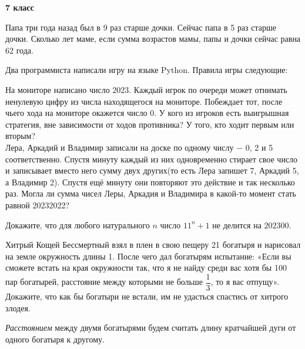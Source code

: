 \hspace{3mm}

\centerline{\bf \Huge 7 класс}

\hspace{3mm}

 Папа три года назад был в 9 раз старше дочки. Сейчас папа в 5 раз старше дочки. Сколько лет маме, если сумма возрастов мамы, папы и дочки сейчас равна 62 года.

 Два программиста написали игру на языке Python. Правила игры следующие:\par
На мониторе написано число 2023. Каждый игрок по очереди может отнимать ненулевую цифру из числа находящегося на мониторе. Побеждает тот, после чьего хода на мониторе окажется число 0. У кого из игроков есть выигрышная стратегия, вне зависимости от ходов противника? У того, кто ходит первым или вторым? \\
 Лера, Аркадий и Владимир записали на доске по одному числу $-$ 0, 2 и 5 соответственно. Спустя минуту каждый из них одновременно стирает свое число и записывает вместо него сумму двух других(то есть Лера запишет 7, Аркадий 5, а Владимир 2). Спустя ещё минуту они повторяют это действие и так несколько раз. Могла ли сумма чисел Леры, Аркадия и Владимира в какой-то момент стать равной 20232022?


 Докажите, что для любого натурального $n$ число $11^n + 1$ не делится на $202300$.


 Хитрый Кощей Бессмертный взял в плен в свою пещеру 21 богатыря и нарисовал на земле окружность длины 1. После чего дал богатырям испытание: «Если вы сможете встать на края окружности так, что я не найду среди вас хотя бы 100 пар богатырей, расстояние между которыми не больше $\dfrac{1}{3}$, то я вас отпущу». Докажите, что как бы богатыри не встали, им не удасться спастись от хитрого злодея. 
\par
\textit{Расстоянием} между двумя богатырями будем считать длину кратчайшей дуги от одного богатыря к другому.

